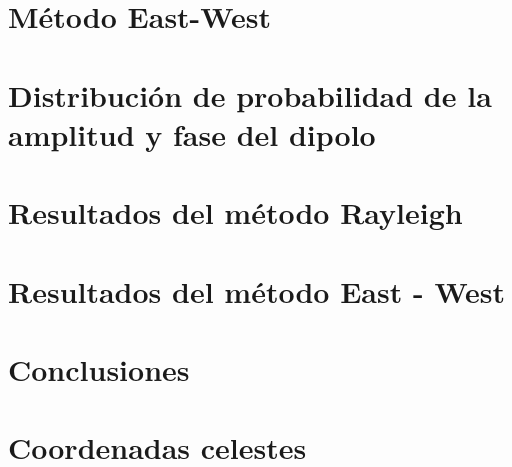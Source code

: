 \documentclass[12pt,papel,twoside,pagebackref]{ibtesis}
\begin{document}
\chapter{Método East-West}
	\graphicspath{{../EW/}}
	
	
\chapter{Distribución de probabilidad de la amplitud y fase del dipolo} \label{PDFs}
	\graphicspath{{../EW/}}
	

\chapter{Resultados del método Rayleigh}
	\graphicspath{{../Dipole_1-2_EeVReport/}}
	


\chapter{Resultados del método East - West}
	\graphicspath{{../EW/}}	
	

\chapter{Conclusiones}
% 	

\appendix
	\chapter{Coordenadas celestes}
	

\begin{biblio}
	
\end{biblio}
\end{document}
